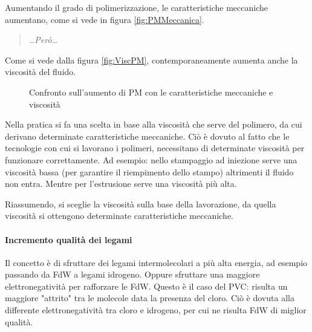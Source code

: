 Aumentando il grado di polimerizzazione, le caratteristiche meccaniche aumentano, come si vede in figura \ref{fig:PMMeccanica}.
\begin{quote}
\emph{\dots Però\dots}
\end{quote}

Come si vede dalla figura \ref{fig:ViscPM}, contemporaneamente aumenta anche la viscosità del fluido.

\begin{figure}
\centering
{}\quad
{}
\caption{Confronto sull'aumento di \ac{PM} con le caratteristiche meccaniche e viscosità}
\label{fig:ConfPM}
\end{figure}

Nella pratica si fa una scelta in base alla viscosità che serve del polimero, da cui derivano determinate caratteristiche meccaniche.
Ciò è dovuto al fatto che le tecnologie con cui si lavorano i polimeri, necessitano di determinate viscosità per funzionare correttamente.
Ad esempio: nello stampaggio ad iniezione serve una viscosità bassa (per garantire il riempimento dello stampo) altrimenti il fluido non entra.
Mentre per l'estrusione serve una viscosità più alta.

Riassumendo, si sceglie la viscosità sulla base della lavorazione, da quella viscosità si ottengono determinate caratteristiche meccaniche.

\paragraph{Incremento qualità dei legami}
Il concetto è di sfruttare dei legami intermolecolari a più alta energia, ad esempio passando da \ac{FdW} a legami idrogeno. Oppure sfruttare una maggiore elettronegatività per rafforzare le \ac{FdW}.
Questo è il caso del \ac{PVC}: risulta un maggiore "attrito" tra le molecole data la presenza del cloro. Ciò è dovuta alla differente elettronegatività tra cloro e idrogeno, per cui ne risulta \ac{FdW} di miglior qualità.


